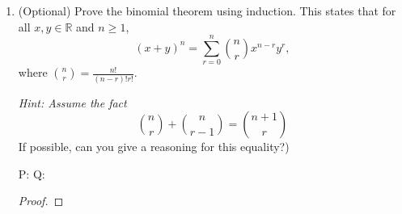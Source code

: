 \documentclass{article} %
\theoremstyle{plain}
\theoremstyle{definition}
\theoremstyle{case}
\begin{document}
\begin{enumerate}[label={\fbox{\textbf{Exercise \#\arabic* :}}}]
  \renewcommand\qedsymbol{\Lightning}
  \begin{proof}[\textbf{Proof by contradiction}]  Towards a contradiction,
    Let's assume that there is some rational number, $x = p/q$, where
    gcd($p,q) = 1$, which is a solution to this equation.

    The equation becomes
    \[
      \left( \frac{p}{q}\right) ^n
        + a_{n-1}\left( \frac{p}{q}\right) ^{n-1}
        + \dots + a_{1}\left( \frac{p}{q}\right)^{1}
        + a_0 = 0
      \]
      Subtracting $a_0$, we get 
    \[
      \left( \frac{p}{q}\right) ^n
        + a_{n-1}\left( \frac{p}{q}\right) ^{n-1}
        + \dots + a_{1}\left( \frac{p}{q}\right)^{1}
        = - a_0
      \]
      Factoring out $\left( \frac{p}{q} \right)^n$ we have
    \[
      \left( \frac{p}{q}\right) ^n \left(
        1 + a_{n-1}\left( \frac{p}{q}\right) ^{-1}
        + \dots +
        a_{1}\left( \frac{p}{q}\right)^{1-n}
        \right)
        = - a_0
      \]
      And now we multiply both sides by $q^n$ and mu;ltiply by $p^n$
      on the lefft to getto get 
    \[
        p^n + a_{n-1}p^{n-1}q
        + \dots +
        a_{1} p q^{n-1}
        + a_0 q^n  = 0
      \]
      And factoring out $p$ we get
    \[
        p^n + q ( a_{n-1}p^{n-1}
        + \dots +
        a_{1} p q^{n-2}
        + a_0 q^{n-1} )  = 0
      \]
      Alright!  Now we're getting close to our contradiction!  Now
      we say
      \[ m = 
        a_{n-1}p^{n-1}
        + \dots +
        a_{1} p q^{n-2}
        + a_0 q^{n-1}
      \]
      $m$ is an integer because it's the product of integer.
      So we have $p^n = -qm$, or $\frac{p^2}{q} = -m$.
      OK, OK!  So remember how we said that gcd($p,q)=1$?  Well
      then how can $\frac{p^2}{q}$ be equal to an integer?!  It can't!
      BAM!

  \end{proof} 
  \renewcommand\qedsymbol{$\square$}
\newpage
\item (Optional) Prove the binomial theorem using induction. This states that for all $x,y \in \mathbb{R}$ and $n\geq 1$,
  \[ (x+y)^n = \sum_{r=0}^{n} \binom{n}{r} x^{n-r} y^{r}, \]
      where $\binom{n}{r} = \frac{n!}{(n-r)! r!}$. 

    \emph{Hint: Assume the fact }
    \[ \binom{n}{r}+ \binom{n}{r-1} = \binom{n+1}{r} \]
    If possible, can you give a reasoning for this equality?)

P: 
Q:

\begin{proof}
\end{proof} 

\newpage
\end{enumerate}
\end{document}
